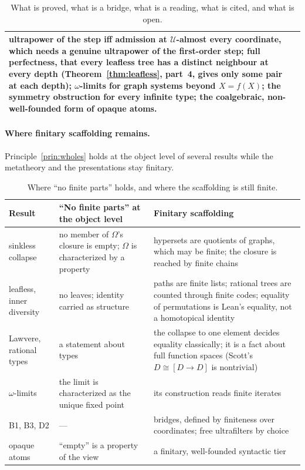 \documentclass[]{article}
\theoremstyle{definition}
\theoremstyle{remark}
\newcommand{\Uf}{\mathcal{U}}
\newcommand{\Om}{\Omega}
\begin{document}
\begin{table}[H]
\begin{tabular}{@{}L{0.25\textwidth}L{0.69\textwidth}@{}}
  ultrapower of the step iff admission at $\Uf$-almost every coordinate, which needs a genuine
  ultrapower of the first-order step; full perfectness, that every leafless tree has a distinct
  neighbour at every depth (Theorem~\ref{thm:leafless}, part~4, gives only some pair at each depth);
  $\omega$-limits for graph systems beyond $X=f(X)$; the symmetry obstruction for every infinite type;
  the coalgebraic, non-well-founded form of opaque atoms. \\
\bottomrule
\end{tabular}
\caption{What is proved, what is a bridge, what is a reading, what is cited, and what is open.}
\label{tab:scope}
\end{table}

\paragraph{Where finitary scaffolding remains.} Principle~\ref{prin:wholes} holds at the object level
of several results while the metatheory and the presentations stay finitary.

\begin{table}[H]
\centering\small
\begin{tabular}{@{}L{0.17\textwidth}L{0.35\textwidth}L{0.39\textwidth}@{}}
\toprule
Result & ``No finite parts'' at the object level & Finitary scaffolding \\
\midrule
sinkless collapse & no member of $\Om$'s closure is empty; $\Om$ is characterized by a property &
  hypersets are quotients of graphs, which may be finite; the closure is reached by finite chains \\
leafless, inner diversity & no leaves; identity carried as structure &
  paths are finite lists; rational trees are counted through finite codes; equality of permutations
  is Lean's equality, not a homotopical identity \\
Lawvere, rational types & a statement about types &
  the collapse to one element decides equality classically; it is a fact about full function spaces
  (Scott's $D\cong[D\to D]$ is nontrivial) \\
$\omega$-limits & the limit is characterized as the unique fixed point &
  its construction reads finite iterates \\
B1, B3, D2 & --- & bridges, defined by finiteness over coordinates; free ultrafilters by choice \\
opaque atoms & ``empty'' is a property of the view &
  a finitary, well-founded syntactic tier \\
\bottomrule
\end{tabular}
\caption{Where ``no finite parts'' holds, and where the scaffolding is still finite.}
\label{tab:scaffolding}
\end{table}
\end{document}
